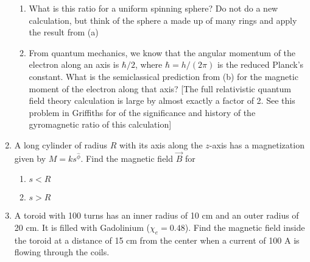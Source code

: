 \begin{enumerate}
\begin{enumerate}
      \item What is this ratio for a uniform spinning sphere?  Do not do a new calculation, but think of the sphere a made up of many rings and apply the result from (a)

      \item From quantum mechanics, we know that the angular momentum of the electron along an axis is $\hbar/2$, where $\hbar=h/(2\pi)$ is the reduced Planck’s constant. What is the semiclassical prediction from (b) for the magnetic moment of the electron along that axis? [The full relativistic quantum field theory calculation is large by almost exactly a factor of 2.  See this problem in Griffiths for of the significance and history of the gyromagnetic ratio of this calculation]

    \end{enumerate}

  \item A long cylinder of radius $R$ with its axis along the $z$-axis has a magnetization given by $M=ks^\hat{\phi}$. Find the magnetic field $\vec{B}$ for 

    \begin{enumerate}

      \item $s<R$

      \item $s>R$

    \end{enumerate}

  \item A toroid with 100 turns has an inner radius of 10 cm and an outer radius of 20 cm. It is filled with Gadolinium ($\chi_e=0.48$). Find the magnetic field inside the toroid at a distance of 15 cm from the center when a current of 100 A is flowing through the coils.

\end{enumerate}



